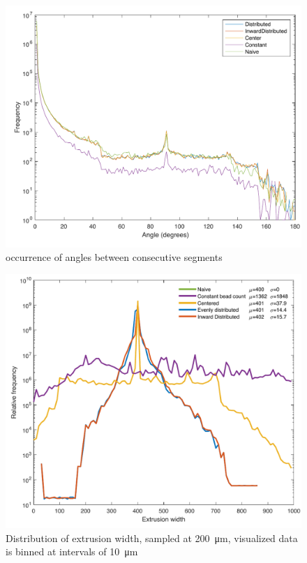 \begin{figure}
\includegraphics[width=\columnwidth]{sources/validation/smoothness.pdf}
\caption{occurrence of angles between consecutive segments}
\label{smoothness}
\end{figure}

\begin{figure}
\includegraphics[width=\columnwidth]{sources/validation/widthHistogram.pdf}
\caption{Distribution of extrusion width, sampled at  \SI{200}{\micro\meter}, visualized data is binned at intervals of  \SI{10}{\micro\meter}}
\label{widthHistogram}
\end{figure}

